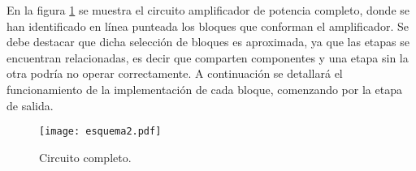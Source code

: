 En la figura \ref{fig.cto_completo} se muestra el circuito amplificador de potencia completo, donde se han identificado en línea punteada los bloques que conforman el amplificador. Se debe destacar que dicha selección de bloques es aproximada, ya que las etapas se encuentran relacionadas, es decir que comparten componentes y una etapa sin la otra podría no operar correctamente. A continuación se detallará el funcionamiento de la implementación de cada bloque, comenzando por la etapa de salida.

\begin{figure}[H]
	\texttt{[image: esquema2.pdf]}
	\caption{Circuito completo.}
	\label{fig.cto_completo}
\end{figure}

\pagebreak
